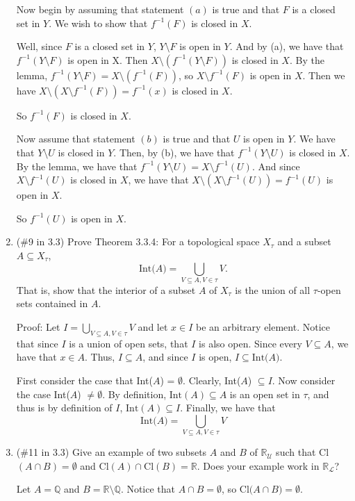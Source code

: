 \documentclass[12pt]{article}
\begin{document}
\begin{enumerate}
Now begin by assuming that statement $(a)$ is true and that $F$ is a closed set in $Y$. 
We wish to show that $f^{-1}(F)$ is closed in $X$. 

Well, since $F$ is a closed set in $Y$, $Y \setminus F$ is open in $Y$. And by (a), we have that $f^{-1}(Y \setminus F)$ is open in X.
Then $X \setminus (f^{-1}(Y \setminus F))$ is closed in $X$.
By the lemma, $f^{-1}(Y \setminus F) = X \setminus (f^{-1}(F))$, so $X \setminus f^{-1}(F)$ is open in $X$. 
Then we have $X \setminus (X \setminus f^{-1}(F)) = f^{-1}(x)$ is closed in $X$.

So $f^{-1}(F)$ is closed in $X$.

Now assume that statement $(b)$ is true and that $U$ is open in $Y$. We have that $Y \setminus U$ is closed in $Y$. Then, by (b), we have that $f^{-1}(Y \setminus U)$ is closed in $X$. By the lemma, we have that $f^{-1}(Y \setminus U) = X \setminus f^{-1}(U)$. And since $X \setminus f^{-1}(U)$ is closed in $X$, we have that $X \setminus (X \setminus f^{-1}(U)) = f^{-1}(U)$ is open in $X$.

So $f^{-1}(U)$ is open in $X$.
 
\item (\#9 in 3.3) Prove Theorem 3.3.4: For a topological space $X_{\tau}$ and a subset $A\subseteq X_{\tau}$,\[ \text{Int($A$)}=\bigcup_{V\subseteq A, V\in\tau}V.\]  That is, show that the interior of a subset $A$ of $X_{\tau}$ is the union of all $\tau$-open sets contained in $A$.

Proof: Let $I = \bigcup_{V \subseteq A, V \in \tau}V$ and let $x \in I$ be an arbitrary element. Notice that since $I$ is a union of open sets, that $I$ is also open. Since every $V \subseteq A$, we have that $x \in A$. Thus, $I \subseteq A$, and since $I$ is open, $I \subseteq \text{Int($A$)}$.

First consider the case that Int($A$) = $\emptyset$. Clearly, Int($A$) $\subseteq I$. Now consider the case Int($A$) $\neq \emptyset$. By definition, $\text{Int}(A) \subseteq A$ is an open set in $\tau$, and thus is by definition of $I$, $\text{Int}(A) \subseteq I$.
Finally, we have that
\[\text{Int($A$)} = \bigcup_{V \subseteq A, V \in \tau}V\]

\item (\#11 in 3.3) Give an example of two subsets $A$ and $B$ of $\mathbb{R}_{\mathcal{U}}$ such that Cl$(A\cap B)=\emptyset$ and $\text{Cl}(A)\cap\text{Cl}(B)=\mathbb{R}$. Does your example work in $\mathbb{R}_{\mathcal{L}}$?

Let $A = \mathbb{Q}$ and $B = \mathbb{R} \setminus \mathbb{Q}$. Notice that $A \cap B = \emptyset$, so $\text{Cl($A \cap B$)} = \emptyset$. 


\end{enumerate}
\end{document}
